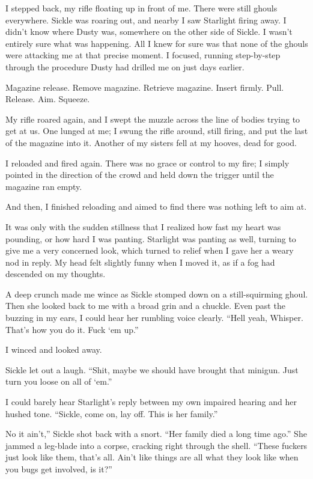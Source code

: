 I stepped back, my rifle floating up in front of me. There were still ghouls everywhere. Sickle was roaring out, and nearby I saw Starlight firing away. I didn’t know where Dusty was, somewhere on the other side of Sickle. I wasn’t entirely sure what was happening. All I knew for sure was that none of the ghouls were attacking me at that precise moment. I focused, running step-by-step through the procedure Dusty had drilled me on just days earlier.

Magazine release. Remove magazine. Retrieve magazine. Insert firmly. Pull. Release. Aim. Squeeze.

My rifle roared again, and I swept the muzzle across the line of bodies trying to get at us. One lunged at me; I swung the rifle around, still firing, and put the last of the magazine into it. Another of my sisters fell at my hooves, dead for good.

I reloaded and fired again. There was no grace or control to my fire; I simply pointed in the direction of the crowd and held down the trigger until the magazine ran empty.

And then, I finished reloading and aimed to find there was nothing left to aim at.

It was only with the sudden stillness that I realized how fast my heart was pounding, or how hard I was panting. Starlight was panting as well, turning to give me a very concerned look, which turned to relief when I gave her a weary nod in reply. My head felt slightly funny when I moved it, as if a fog had descended on my thoughts.

A deep crunch made me wince as Sickle stomped down on a still-squirming ghoul. Then she looked back to me with a broad grin and a chuckle. Even past the buzzing in my ears, I could hear her rumbling voice clearly. “Hell yeah, Whisper. That’s how you do it. Fuck ‘em up.”

I winced and looked away.

Sickle let out a laugh. “Shit, maybe we should have brought that minigun. Just turn you loose on all of ‘em.”

I could barely hear Starlight’s reply between my own impaired hearing and her hushed tone. “Sickle, come on, lay off. This is her family.”

\leavevmode{}No it ain’t,” Sickle shot back with a snort. “Her family died a long time ago.” She jammed a leg-blade into a corpse, cracking right through the shell. “These fuckers just look like them, that’s all. Ain’t like things are all what they look like when you bugs get involved, is it?”

